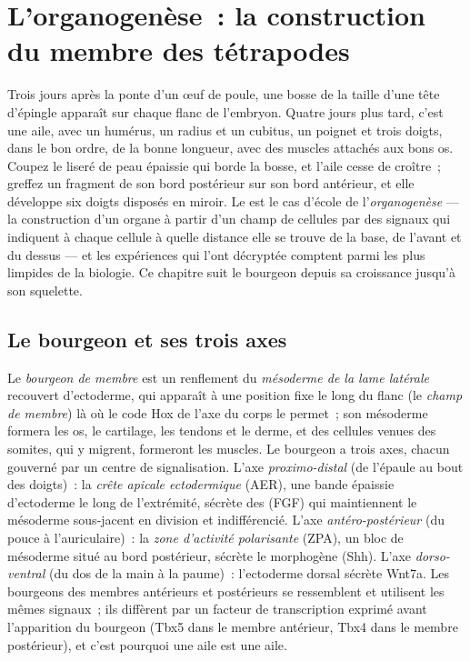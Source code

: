 \chapter{L'organogenèse~: la construction du membre des tétrapodes}\label{ch:b2:limb-organogenesis}

Trois jours après la ponte d'un œuf de poule, une bosse de la taille
d'une tête d'épingle apparaît sur chaque flanc de l'embryon. Quatre
jours plus tard, c'est une aile, avec un humérus, un radius et un
cubitus, un poignet et trois doigts, dans le bon ordre, de la bonne
longueur, avec des muscles attachés aux bons os. Coupez le liseré de
peau épaissie qui borde la bosse, et l'aile cesse de croître~; greffez
un fragment de son bord postérieur sur son bord antérieur, et elle
développe six doigts disposés en miroir. Le  est le
cas d'école de l'\emph{organogenèse} --- la construction d'un organe à
partir d'un champ de cellules par des signaux qui indiquent à chaque
cellule à quelle distance elle se trouve de la base, de l'avant et du
dessus --- et les expériences qui l'ont décryptée comptent parmi les plus
limpides de la biologie. Ce chapitre suit le bourgeon depuis sa
croissance jusqu'à son squelette.

\section{Le bourgeon et ses trois axes}

\begin{definition}\label{def:b2:limb-organogenesis:bud}
Le \emph{bourgeon de membre} est un renflement du \emph{mésoderme de la
lame latérale} recouvert d'ectoderme, qui apparaît à une position fixe
le long du flanc (le \emph{champ de membre}) là où le code Hox de l'axe
du corps le permet~; son mésoderme formera les os, le cartilage, les
tendons et le derme, et des cellules venues des somites, qui y
migrent, formeront les muscles. Le bourgeon a trois axes, chacun
gouverné par un centre de signalisation. L'axe \emph{proximo-distal}
(de l'épaule au bout des doigts)~: la \emph{crête apicale ectodermique}
(AER), une bande épaissie d'ectoderme le long de l'extrémité, sécrète
des  (FGF) qui maintiennent le
mésoderme sous-jacent en division et indifférencié. L'axe
\emph{antéro-postérieur} (du pouce à l'auriculaire)~: la \emph{zone
d'activité polarisante} (ZPA), un bloc de mésoderme situé au bord
postérieur, sécrète le morphogène \emph{} (Shh). L'axe
\emph{dorso-ventral} (du dos de la main à la paume)~: l'ectoderme dorsal
sécrète Wnt7a. Les bourgeons des membres antérieurs et postérieurs se
ressemblent et utilisent les mêmes signaux~; ils diffèrent par un
facteur de transcription exprimé avant l'apparition du bourgeon (Tbx5
dans le membre antérieur, Tbx4 dans le membre postérieur), et c'est
pourquoi une aile est une aile.
\end{definition}

